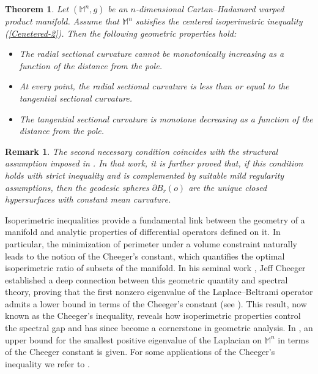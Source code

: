 \documentclass[a4paper,11pt,reqno]{amsart}
\renewcommand\eqref[1]{(\ref{#1})}
\theoremstyle{plain}
\newtheorem{theorem}{Theorem}[section]
\newtheorem{remark}{Remark}[section]
\numberwithin{equation}{section} \allowdisplaybreaks
\newcommand{\m}{\mathbb{M}^n}
\begin{document}
\begin{theorem}\label{third}
Let $(\m,g)$ be an $n$-dimensional Cartan--Hadamard warped product manifold. 
Assume that $\m$ satisfies the centered isoperimetric inequality \eqref{Cenetered-2}. 
Then the following geometric properties hold:

\begin{itemize}
    \item[(i)] The radial sectional curvature cannot be monotonically increasing as a function of the distance from the pole.
    
    \item[(ii)] At every point, the radial sectional curvature is less than or equal to the tangential sectional curvature.
    
    \item[(iii)] The tangential sectional curvature is monotone decreasing as a function of the distance
from the pole.
\end{itemize}
\end{theorem}

\medskip

\begin{remark}
{\rm 
   The second necessary condition coincides with the structural assumption imposed in \cite[Theorem~1.4]{Brendle}. In that work, it is further proved that, if this condition holds with strict inequality and is complemented by suitable mild regularity assumptions, then the geodesic spheres $\partial B_r(o)$ are the unique closed hypersurfaces with constant mean curvature.}
\end{remark}

Isoperimetric inequalities provide a fundamental link between the geometry of a manifold and analytic properties of differential operators defined on it. In particular, the minimization of perimeter under a volume constraint naturally leads to the notion of the Cheeger's constant, which quantifies the optimal isoperimetric ratio of subsets of the manifold. In his seminal work \cite{Cheeger}, Jeff Cheeger established a deep connection between this geometric quantity and spectral theory, proving that the first nonzero eigenvalue of the Laplace–Beltrami operator admits a lower bound in terms of the Cheeger's constant (see \cite{Chavel}). This result, now known as the Cheeger's inequality, reveals how isoperimetric properties control the spectral gap and has since become a cornerstone in geometric analysis. In \cite{Buser}, an upper bound for the smallest positive eigenvalue of the Laplacian on $\m$ in terms of the Cheeger constant is given. For some applications of the Cheeger's inequality we refer to \cite{Brooks 1, Brooks 2, Dodziuk 1, Dodziuk 2, Donnely, Osser}.
\end{document}
